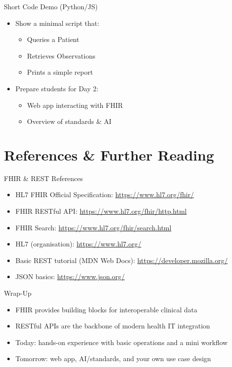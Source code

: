 \documentclass[aspectratio=1610]{beamer}
\begin{document}
	\begin{frame}{Short Code Demo (Python/JS)}
		\begin{itemize}
			\item Show a minimal script that:
			\begin{itemize}
				\item Queries a Patient
				\item Retrieves Observations
				\item Prints a simple report
			\end{itemize}
			\item Prepare students for Day 2:
			\begin{itemize}
				\item Web app interacting with FHIR
				\item Overview of standards \& AI
			\end{itemize}
		\end{itemize}
	\end{frame}
	
	\section{References \& Further Reading}
	
	\begin{frame}{FHIR \& REST References}
		\small
		\begin{itemize}
			\item HL7 FHIR Official Specification: \url{https://www.hl7.org/fhir/}
			\item FHIR RESTful API: \url{https://www.hl7.org/fhir/http.html}
			\item FHIR Search: \url{https://www.hl7.org/fhir/search.html}
			\item HL7 (organisation): \url{https://www.hl7.org/}
		\end{itemize}
		\vspace{0.5em}
		\begin{itemize}
			\item Basic REST tutorial (MDN Web Docs): \url{https://developer.mozilla.org/}
			\item JSON basics: \url{https://www.json.org/}
		\end{itemize}
	\end{frame}
	
	\begin{frame}{Wrap-Up}
		\begin{itemize}
			\item FHIR provides building blocks for interoperable clinical data
			\item RESTful APIs are the backbone of modern health IT integration
			\item Today: hands-on experience with basic operations and a mini workflow
			\item Tomorrow: web app, AI/standards, and your own use case design
		\end{itemize}
	\end{frame}
	
\end{document}
